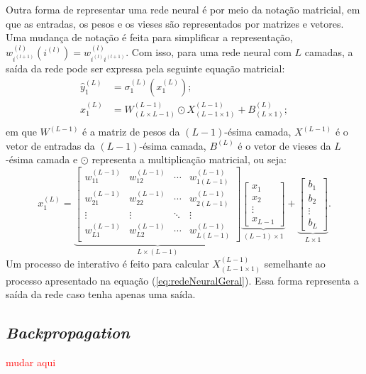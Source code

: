 Outra forma de representar uma rede neural é por meio da notação matricial, em que as entradas, os pesos e os vieses são representados por matrizes e vetores. Uma mudança de notação é feita para simplificar a representação, $w^{(l)}_{i^{(l+1)}}(i^{(l)}) = w^{(l)}_{i^{(l)} i^{(l+1)}}$. Com isso, para uma rede neural com $L$ camadas, a saída da rede pode ser expressa pela seguinte equação matricial:
\begin{equation}  
    \begin{aligned}
        \hat{y}_1^{(L)} & = \sigma_1^{(L)}\left(x_1^{(L)}\right); \\
        x_1^{(L)} & = W_{(L \times L-1)}^{(L-1)}\odot X_{(L-1 \times 1)}^{(L-1)} + B_{(L \times 1)}^{(L)}; \\
    \end{aligned}
\end{equation}
em que $W^{(L-1)}$ é a matriz de pesos da $(L-1)$-ésima camada, $X^{(L-1)}$ é o vetor de entradas da $(L-1)$-ésima camada, $B^{(L)}$ é o vetor de vieses da $L$-ésima camada e $\odot$ representa a multiplicação matricial, ou seja:
\[ x_1^{(L)} = 
\underbrace{\begin{bmatrix}
w_{11}^{(L-1)} & w_{12}^{(L-1)} & \cdots & w_{1(L-1)}^{(L-1)} \\
w_{21}^{(L-1)} & w_{22}^{(L-1)} & \cdots & w_{2(L-1)}^{(L-1)} \\
\vdots & \vdots & \ddots & \vdots \\
w_{L1}^{(L-1)} & w_{L2}^{(L-1)} & \cdots & w_{L(L-1)}^{(L-1)}
\end{bmatrix}}_{L \times (L-1)}
\underbrace{\begin{bmatrix}
x_1\\x_2\\\vdots\\x_{L-1}
\end{bmatrix}}_{(L-1) \times 1}
+
\underbrace{\begin{bmatrix}
b_1\\b_2\\\vdots\\b_L
\end{bmatrix}}_{L \times 1}.
\]
Um processo de interativo é feito para calcular $X^{(L-1)}_{(L-1\times1)}$ semelhante ao processo apresentado na equação (\ref{eq:redeNeuralGeral}).
Essa forma representa a saída da rede caso tenha apenas uma saída.

\subsection{\textit{Backpropagation}}
\label{subsec:bacprop}
\textcolor{red}{mudar aqui}

